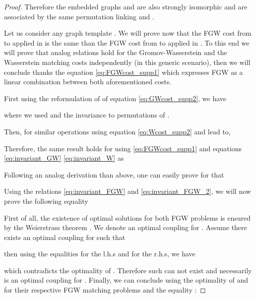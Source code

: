 \documentclass{article}
\begin{document}
{\begin{proof}
Therefore the embedded graphs  and  are also strongly isomorphic and are associated by the same permutation  linking  and .

Let us consider any graph template . We will prove now that the FGW cost from  to  applied in  is the same than the FGW cost from  to  applied in . To this end we will prove that analog relations hold for the Gromov-Wasserstein and the Wasserstein matching costs independently (in this generic scenario), then we will conclude thanks the equation \ref{eq:FGWcost_supp1} which expresses FGW as a linear combination between both aforementioned costs.

First using the reformulation of  of equation \ref{eq:GWcost_supp2}, we have


where we used  and the invariance to permutations of .

 Then, for  similar operations using equation \ref{eq:Wcost_supp2} and   lead to,

Therefore, the same result holds for  using \ref{eq:FGWcost_supp1} and equations \ref{eq:invariant_GW} \ref{eq:invariant_W} as

Following an analog derivation than above, one can easily prove for  that


Using the relations \ref{eq:invariant_FGW} and \ref{eq:invariant_FGW_2}, we will now prove the following equality 




First of all, the existence of optimal solutions for both FGW problems is ensured by the Weierstrass theorem \cite{santambrogio2015optimal}. We denote an optimal coupling  for . Assume there exists an optimal coupling  for  such that 

then using the equalities  for the l.h.s and  for the r.h.s, we have

which contradicts the optimality of . Therefore such  can not exist and necessarily  is an optimal coupling for . Finally, we can conclude using the optimality of  and  for their respective FGW matching problems and the equality :

\end{proof}

}
\end{document}
